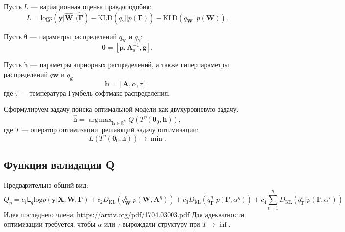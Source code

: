 \documentclass[12pt]{article}
\DeclareMathOperator*{\argmax}{arg\,max}
\begin{document}
Пусть $L$ --- вариационная оценка правдоподобия:
\[
    L = \text{log} p(\mathbf{y}|\hat{\mathbf{W}}, \hat{(\boldsymbol{\Gamma}}) - \text{KLD}(q_\gamma||p(\boldsymbol{\Gamma})) - \text{KLD}(q_\mathbf{W}||p(\mathbf{W})).
\]


Пусть $\boldsymbol{\theta}$ --- параметры распределений $q_\mathbf{w}$ и $q_\gamma$:
\[
    \boldsymbol{\theta} = [\boldsymbol{\mu}, \mathbf{A}_q^{-1}, \mathbf{g}].
\] 

Пусть $\mathbf{h}$ --- параметры априорных распределений, а также гиперпараметры распределений  $q\mathbf{w}$ и $q_\mathbf{g}$:
\[
    \mathbf{h} = [\mathbf{A}, \alpha, \tau],
\]
где $\tau$ --- температура Гумбель-софтмакс распределения.



Сформулируем задачу поиска оптимальной модели как двухуровневую задачу.
\begin{equation}
\label{eq:optim}
	\hat{\mathbf{h}} = \argmax_{\mathbf{h} \in \mathbb{R}^h} Q( T^\eta(\boldsymbol{\theta}_0, \mathbf{h})),
\end{equation}
где $T$ --- оператор оптимизации, решающий задачу оптимизации:
\[
    L(T^\eta(\boldsymbol{\theta}_0, \mathbf{h})) \to \min.
\]

\subsection{Функция валидации Q}
Предварительно общий вид:
\[
Q_\eta = c_1 \mathsf{E}_q \text{log}p(\mathbf{y}|\mathbf{X}, \mathbf{W}, \boldsymbol{\Gamma}) + c_2 D_\text{KL}(q_\mathbf{W}^\eta|p(\mathbf{W}, \mathbf{A}^\eta)) + c_3 D_\text{KL}(q_{\boldsymbol{\Gamma}}^\eta|p(\boldsymbol{\Gamma}, \alpha^\eta)) + c_4 \sum_{t = 1}^\eta D_\text{KL}(q_{\boldsymbol{\Gamma}}^t|p(\boldsymbol{\Gamma}, \alpha^\tau))
\] 
Идея последнего члена: https://arxiv.org/pdf/1704.03003.pdf
Для адекватности оптимизации требуется, чтобы $\alpha$ или $\tau$ вырождали структуру при $T \to \inf$.
\end{document}
